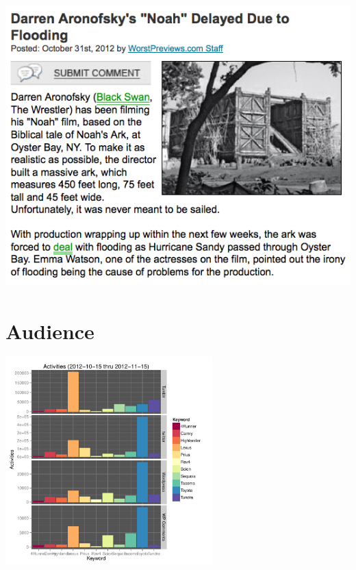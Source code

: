 \documentclass{beamer}
\begin{document}
\begin{frame}
  \begin{center}
    \includegraphics[height=11cm]{./imgs/flooding.png}
  \end{center}
\end{frame}


\section{Audience}
{
\begin{frame}
\textcolor{black} {
\hfill \Huge \insertsection}
\end{frame}
}

\begin{frame}
  \begin{center}
    \includegraphics[width=8cm]{./imgs/TOY_bars.pdf}
  \end{center}
\end{frame}
\end{document}
